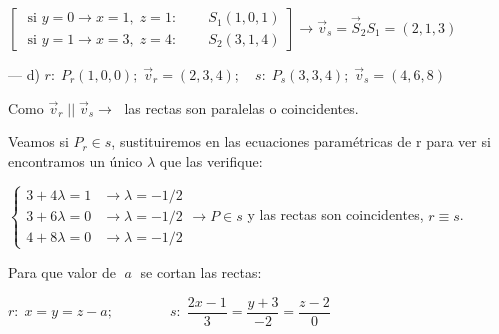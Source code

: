 \begin{proofw}
\noindent \textcolor{gris}{$\left[\begin{matrix} 
\text{ si } y=0 \to x=1,\; z=1:&\;\;&S_1(1,0,1) \\
\text{ si } y=1 \to x=3,\; z=4:&\;\;&S_2(3,1,4)
  \end{matrix} \right] \to \vec v_s = \overrightarrow S_2S_1=(2,1,3)$}
  
\noindent --- d) $r:\; P_r(1,0,0); \; \vec v_r=(2,3,4); \quad s:\; P_s(3,3,4); \; \vec v_s=(4,6,8)$  

\noindent Como $\vec v_r\;||\; \vec v_s \to \;$ las rectas son paralelas o coincidentes.

\noindent Veamos si $P_r \in s $, sustituiremos en las ecuaciones paramétricas de r para ver si encontramos un único $\lambda$ que las verifique:

\noindent $\begin{cases} 3+4\lambda=1 &\to \lambda=-1/2 \\ 3+6\lambda=0 &\to \lambda=-1/2 \\ 4+8\lambda=0 & \to \lambda=-1/2 \end{cases} \to P\in s$ y las rectas son coincidentes, $r \equiv s$.



\end{proofw}

\begin{ejre}
	Para que valor de $\;a\;$ se cortan las rectas:
	
	$r:\; x=y=z-a;\qquad \qquad s:\; \dfrac{2x-1}{3}=\dfrac{y+3}{-2}=\dfrac{z-2}{0}$
\end{ejre}

